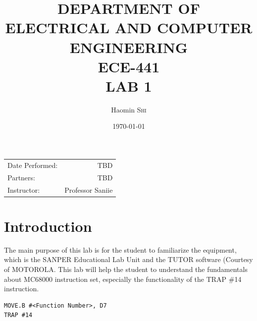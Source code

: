 \documentclass{article}
\title{DEPARTMENT OF ELECTRICAL AND COMPUTER ENGINEERING \\ ECE-441 \\ LAB 1} %
\author{Haomin \textsc{Shi}} %
\date{\today} %
\begin{document}
\maketitle %

\begin{center}
\begin{tabular}{l r}
Date Performed: & TBD \\ %
Partners: & TBD \\ %
Instructor: & Professor Saniie %
\end{tabular}
\end{center}



\section{Introduction}

The main purpose of this lab is for the student to familiarize the equipment, which is the SANPER Educational Lab Unit and the TUTOR software (Courtesy of MOTOROLA\textregistered. This lab will help the student to understand the fundamentals about MC68000 instruction set, especially the functionality of the TRAP \#14 instruction.

\begin{verbatim}MOVE.B #<Function Number>, D7
TRAP #14
\end{verbatim}

\end{document}
